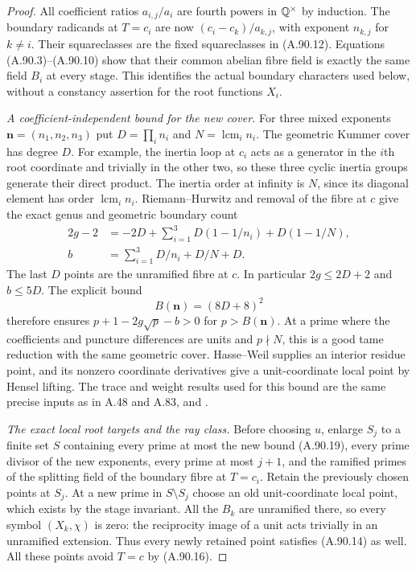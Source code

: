 \begin{proof}
All coefficient ratios $a_{i,j}/a_i$ are fourth
powers in $\mathbb Q^\times$ by induction.
The boundary radicands at $T=c_i$ are now
$(c_i-c_k)/a_{k,j}$, with exponent $n_{k,j}$ for
$k\ne i$.
Their squareclasses are the fixed squareclasses
in (A.90.12).
Equations (A.90.3)--(A.90.10) show that their
common abelian fibre field is exactly the same
field $B_i$ at every stage.
This identifies the actual boundary characters
used below, without a constancy assertion for
the root functions $X_i$.

\emph{A coefficient-independent bound for the new cover.}
For three mixed exponents $\boldsymbol n=(n_1,n_2,n_3)$
put $D=\prod_i n_i$ and $N=\operatorname{lcm}_i n_i$.
The geometric Kummer cover has degree $D$.
For example, the inertia loop at $c_i$ acts as a
generator in the $i$th root coordinate and trivially
in the other two, so these three cyclic inertia
groups generate their direct product.
The inertia order at infinity is $N$, since its
diagonal element has order $\operatorname{lcm}_i n_i$.
Riemann--Hurwitz and removal of the fibre at $c$
give the exact genus and geometric boundary count
\[
 \begin{split}
 2g-2&=-2D+\sum_{i=1}^3D(1-1/n_i)+D(1-1/N),\\
 b&=\sum_{i=1}^3D/n_i+D/N+D .
 \end{split}
 \tag{A.90.18}
\]
The last $D$ points are the unramified fibre at $c$.
In particular $2g\le2D+2$ and $b\le5D$.
The explicit bound
\[
                       B(\boldsymbol n)=(8D+8)^2
 \tag{A.90.19}
\]
therefore ensures $p+1-2g\sqrt p-b>0$ for
$p>B(\boldsymbol n)$.
At a prime where the coefficients and puncture
differences are units and $p\nmid N$, this is a
good tame reduction with the same geometric cover.
Hasse--Weil supplies an interior residue point,
and its nonzero coordinate derivatives give a
unit-coordinate local point by Hensel lifting.
The trace and weight results used for this bound
are the same precise inputs as in A.48 and A.83,
\cite[(1.5.1), Theorem (1.6)]{AgentDeligneWeilI}
and \cite[Proposition 14.2]{AgentMilneLEC}.

\emph{The exact local root targets and the ray class.}
Before choosing $u$, enlarge $S_j$ to a finite set
$S$ containing every prime at most the new bound
(A.90.19), every prime divisor of the new
exponents, every prime at most $j+1$, and the
ramified primes of the splitting field of the
boundary fibre at $T=c_i$.
Retain the previously chosen points at $S_j$.
At a new prime in $S\setminus S_j$ choose an old
unit-coordinate local point, which exists by
the stage invariant.  All the $B_k$ are
unramified there, so every symbol
$(X_k,\chi)$ is zero: the reciprocity image of a
unit acts trivially in an unramified extension.
Thus every newly retained point satisfies
(A.90.14) as well.
All these points avoid $T=c$ by (A.90.16).


\end{proof}
